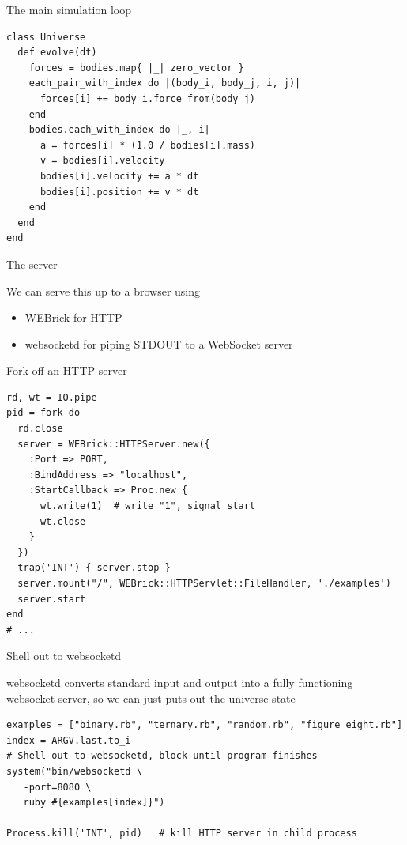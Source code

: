 \documentclass[bigger]{beamer}
\begin{document}
\begin{frame}[fragile,label=sec-30]{The main simulation loop}
 \begin{verbatim}
class Universe
  def evolve(dt)
    forces = bodies.map{ |_| zero_vector }
    each_pair_with_index do |(body_i, body_j, i, j)|
      forces[i] += body_i.force_from(body_j)
    end
    bodies.each_with_index do |_, i|
      a = forces[i] * (1.0 / bodies[i].mass)
      v = bodies[i].velocity 
      bodies[i].velocity += a * dt
      bodies[i].position += v * dt
    end
  end
end
\end{verbatim}
\end{frame}
\begin{frame}[label=sec-31]{The server}
\begin{block}{We can serve this up to a browser using}
\begin{itemize}
\item WEBrick for HTTP
\item websocketd for piping STDOUT to a WebSocket server
\end{itemize}
\end{block}
\end{frame}
\begin{frame}[fragile,label=sec-32]{Fork off an HTTP server}
 \begin{verbatim}
rd, wt = IO.pipe
pid = fork do
  rd.close
  server = WEBrick::HTTPServer.new({
    :Port => PORT,
    :BindAddress => "localhost",
    :StartCallback => Proc.new {
      wt.write(1)  # write "1", signal start
      wt.close
    }
  })
  trap('INT') { server.stop }
  server.mount("/", WEBrick::HTTPServlet::FileHandler, './examples')
  server.start
end
# ...
\end{verbatim}
\end{frame}

\begin{frame}[fragile,label=sec-33]{Shell out to websocketd}
 \begin{block}{websocketd converts standard input and output into a fully functioning websocket server, so we can just puts out the universe state}
\begin{verbatim}
examples = ["binary.rb", "ternary.rb", "random.rb", "figure_eight.rb"]
index = ARGV.last.to_i
# Shell out to websocketd, block until program finishes
system("bin/websocketd \
   -port=8080 \
   ruby #{examples[index]}")

Process.kill('INT', pid)   # kill HTTP server in child process
\end{verbatim}
\end{block}
\end{frame}
\end{document}
